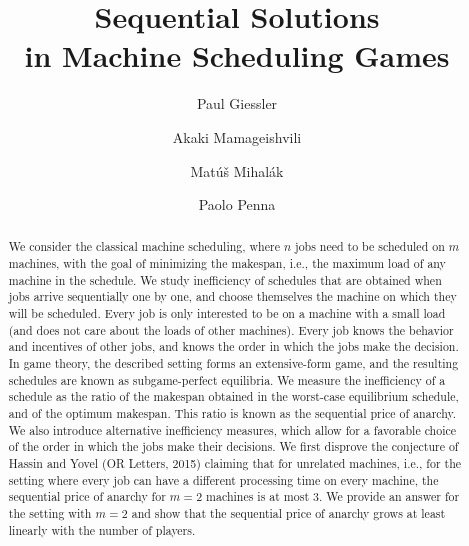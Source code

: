 \documentclass[12pt,a4paper]{article}
\theoremstyle{definition}
\theoremstyle{remark}
\begin{document}
\title{\bf Sequential Solutions \\ in Machine Scheduling Games}  

%


\author[1]{Paul Giessler}
\author[2]{Akaki Mamageishvili}
\author[1]{Mat\'u\v{s} Mihal\'ak}
\author[2]{Paolo Penna}



\date{}



\maketitle

\begin{abstract}
	We consider the classical machine scheduling, where $n$ jobs need to be scheduled on $m$ machines, with the goal of minimizing the makespan, i.e., the maximum load of any machine in the schedule.
	We study inefficiency of schedules that are obtained when jobs arrive sequentially one by one, and choose themselves the machine on which they will be scheduled. Every job is only interested to be on a machine with a small load (and does not care about the loads of other machines). Every job knows the behavior and incentives of other jobs, and knows the order in which the jobs make the decision. 
	In game theory, the described setting forms an extensive-form game, and the resulting schedules are known as subgame-perfect equilibria. 
	We measure the inefficiency of a schedule as the ratio of the makespan obtained in the worst-case equilibrium schedule, and of the optimum makespan. This ratio is known as the sequential price of anarchy. 
	We also introduce alternative inefficiency measures, which allow for a favorable choice of the order in which the jobs make their decisions.
	We first disprove the conjecture of Hassin and Yovel (OR Letters, 2015) claiming that for unrelated machines, i.e., for the setting where every job can have a different processing time on every machine, the sequential price of anarchy for $m=2$ machines is at most 3. 
	We provide an answer for the setting with $m=2$ and show that the sequential price of anarchy grows at least linearly with the number of players.

\end{abstract}
\end{document}
